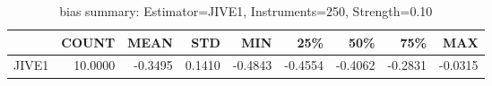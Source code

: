 \begin{table}[ht]
\centering
\caption{bias summary: Estimator=JIVE1, Instruments=250, Strength=0.10}
\begin{tabular}{lrrrrrrrr}
\toprule
 & COUNT & MEAN & STD & MIN & 25\% & 50\% & 75\% & MAX \\
\midrule
JIVE1 & 10.0000 & -0.3495 & 0.1410 & -0.4843 & -0.4554 & -0.4062 & -0.2831 & -0.0315 \\
\bottomrule
\end{tabular}
\end{table}
